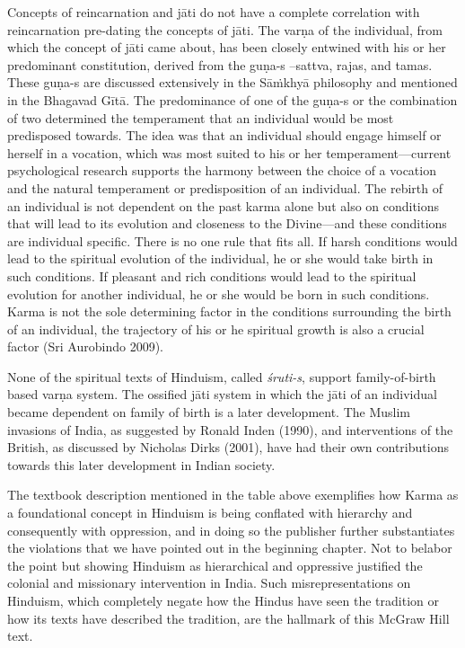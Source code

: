 Concepts of reincarnation and jāti do not have a complete correlation with reincarnation pre-dating the concepts of jāti. The varṇa of the individual, from which the concept of jāti came about, has been closely entwined with his or her predominant constitution, derived from the guṇa-s –sattva, rajas, and tamas. These guṇa-s are discussed extensively in the Sāṁkhyā philosophy and mentioned in the Bhagavad Gītā. The predominance of one of the guṇa-s or the combination of two determined the temperament that an individual would be most predisposed towards. The idea was that an individual should engage himself or herself in a vocation, which was most suited to his or her temperament—current psychological research supports the harmony between the choice of a vocation and the natural temperament or predisposition of an individual. The rebirth of an individual is not dependent on the past karma alone but also on conditions that will lead to its evolution and closeness to the Divine—and these conditions are individual specific. There is no one rule that fits all. If harsh conditions would lead to the spiritual evolution of the individual, he or she would take birth in such conditions. If pleasant and rich conditions would lead to the spiritual evolution for another individual, he or she would be born in such conditions. Karma is not the sole determining factor in the conditions surrounding the birth of an individual, the trajectory of his or he spiritual growth is also a crucial factor (Sri Aurobindo 2009). 

None of the spiritual texts of Hinduism, called \textit{śruti-s},  support family-of-birth based varṇa system. The ossified jāti system in which the jāti of an individual became dependent on family of birth is a later development. The Muslim invasions of India, as suggested by Ronald Inden (1990), and interventions of the British, as discussed by Nicholas Dirks (2001), have had their own contributions towards this later development in Indian society. 

The textbook description mentioned in the table above exemplifies how Karma as a foundational concept in Hinduism is being conflated with hierarchy and consequently with oppression, and in doing so the publisher further substantiates the violations that we have pointed out in the beginning chapter. Not to belabor the point but showing Hinduism as hierarchical and oppressive justified the colonial and missionary intervention in India. Such misrepresentations on Hinduism, which completely negate how the Hindus have seen the tradition or how its texts have described the tradition, are the hallmark of this McGraw Hill text.

